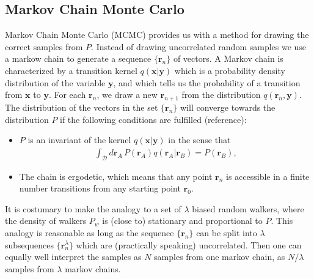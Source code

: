\documentclass[a4paper,10pt,twocolumn]{article} %
\newcommand{\ts}[1]{\textbf{#1}}
\begin{document}
\subsection{Markov Chain Monte Carlo}%

Markov Chain Monte Carlo (MCMC) provides us with a method for drawing the correct samples from $P$. 
Instead of drawing uncorrelated random samples we use a markow chain to generate a sequence $\{\ts r_n\}$ of vectors.
A Markov chain is characterized by a transition kernel $q(\ts x|\ts y)$ which is a probability density distribution 
of the variable $\ts y$, and which tells us the probability of a transition from $\ts x$ to $\ts y$.
For each $\ts r_n$, we draw a new $\ts r_{n+1}$ from the distribution $q(\ts r_n,\ts y)$. The distribution 
of the vectors in the set 
$\{\ts r_n\}$ will converge towards the distribution $P$ if the following 
conditions are fulfilled (reference):
\begin{itemize}
\item
	$P$ is an invariant of the kernel $q(\ts x|\ts y)$ in the sense that 
	\begin{align}
	\int_{\mathcal D} d\ts r_A\, P(\ts r_A) q(\ts r_A | \ts r_B) = P(\ts r_B) \label{eq221},
	\end{align}
\item
	The chain is ergodetic, which means that any point $\ts r_n$ is accessible in a finite number transitions from any starting point $\ts r_0$. 
\end{itemize}

%
%
It is costumary to make the analogy to a set of $\lambda$ biased random walkers, where
the density of walkers $P_w$ is (close to) stationary and proportional to $P$.
This analogy is reasonable as long as the sequence $\{\ts r_n\}$ can be split into $\lambda$ 
subsequences $\{\ts r_n^\lambda\}$ which are (practically speaking) uncorrelated. Then one can equally well interpret the samples as $N$ samples
from one markov chain, as $N/\lambda$ samples from $\lambda$ markov chains.
\end{document}
